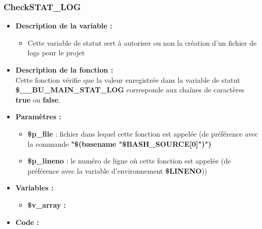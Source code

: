 \documentclass[a4paper,10pt]{article}
\begin{document}
\color{blue}
\subsubsection{CheckSTAT\_LOG}\color{white}
\begin{itemize}
    \item \textbf{Description de la variable :}
    \begin{itemize}
        \item Cette variable de statut sert à autoriser ou non la création d'un fichier de logs pour le projet\\[1\baselineskip]
    \end{itemize}


    \item \textbf{Description de la fonction :}\\
        Cette fonction vérifie que la valeur enregistrée dans la variable de statut \textbf{\color{orange}\$\_\_BU\_MAIN\_STAT\_LOG} corresponde aux chaînes de caractères \textbf{true} ou \textbf{false}.\\[1\baselineskip]

    \item \textbf{Paramètres :}
    \begin{itemize}
        \item \color{orange}\textbf{\$p\_file}\color{white} : fichier dans lequel cette fonction est appelée (de préférence avec la commande \textbf{"\$(\color{gray}basename \color{white}"\color{orange}\$BASH\_SOURCE[0]\color{white}")")}\\[1\baselineskip]

        \item \color{orange}\textbf{\$p\_lineno}\color{white} : le numéro de ligne où cette fonction est appelée (de préférence avec la variable d'environnement \textbf{\color{orange}\$LINENO}))\\[1\baselineskip]
    \end{itemize}

    \item \textbf{Variables :}
    \begin{itemize}
        \item \textbf{\color{orange}\$v\_array\color{white} :}\\[1\baselineskip]
    \end{itemize}


    \item \textbf{Code :}
\end{itemize}
\end{document}
